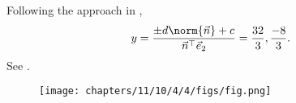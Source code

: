 Following the approach in ,
\begin{align}
		y = \frac{\pm d\norm{\vec{n}}+c}{\vec{n}^\top\vec{e}_{2}}
= \frac{32}{3}, \frac{-8}{3}.
\end{align}
See 
		.
\begin{figure}[H]
\centering
\texttt{[image: chapters/11/10/4/4/figs/fig.png]}
\caption{}
		\label{fig:chapters/11/10/4/4/Figure}
\end{figure}
